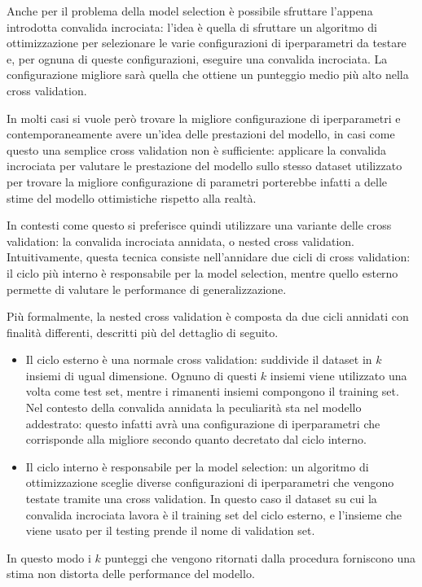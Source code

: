 \documentclass[../../main.tex]{subfiles}
\begin{document}
    Anche per il problema della model selection è possibile sfruttare l'appena introdotta convalida incrociata: l'idea è quella di sfruttare un algoritmo di ottimizzazione per selezionare le varie configurazioni di iperparametri da testare e, per ognuna di queste configurazioni, eseguire una convalida incrociata. La configurazione migliore sarà quella che ottiene un punteggio medio più alto nella cross validation.
    
    In molti casi si vuole però trovare la migliore configurazione di iperparametri e contemporaneamente avere un'idea delle prestazioni del modello, in casi come questo una semplice cross validation non è sufficiente: applicare la convalida incrociata per valutare le prestazione del modello sullo stesso dataset utilizzato per trovare la migliore configurazione di parametri porterebbe infatti a delle stime del modello ottimistiche rispetto alla realtà.

    In contesti come questo si preferisce quindi utilizzare una variante delle cross validation: la convalida incrociata annidata, o nested cross validation. Intuitivamente, questa tecnica consiste nell'annidare due cicli di cross validation: il ciclo più interno è responsabile per la model selection, mentre quello esterno permette di valutare le performance di generalizzazione.

    Più formalmente, la nested cross validation è composta da due cicli annidati con finalità differenti, descritti più del dettaglio di seguito.
    \begin{itemize}
        \item Il ciclo esterno è una normale cross validation: suddivide il dataset in $k$ insiemi di ugual dimensione. Ognuno di questi $k$ insiemi viene utilizzato una volta come test set, mentre i rimanenti insiemi compongono il training set. Nel contesto della convalida annidata la peculiarità sta nel modello addestrato: questo infatti avrà una configurazione di iperparametri che corrisponde alla migliore secondo quanto decretato dal ciclo interno.
        \item Il ciclo interno è responsabile per la model selection: un algoritmo di ottimizzazione sceglie diverse configurazioni di iperparametri che vengono testate tramite una cross validation. In questo caso il dataset su cui la convalida incrociata lavora è il training set del ciclo esterno, e l'insieme che viene usato per il testing prende il nome di validation set.
    \end{itemize}
    In questo modo i $k$ punteggi che vengono ritornati dalla procedura forniscono una stima non distorta delle performance del modello.
\end{document}
